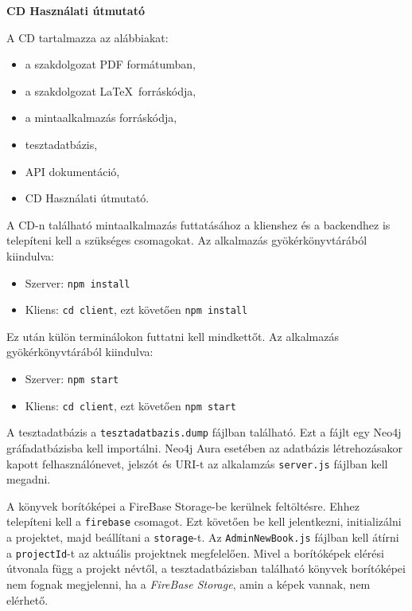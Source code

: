 \pagestyle{empty}

\noindent \textbf{\Large CD Használati útmutató}

\vskip 1cm

\noindent A CD tartalmazza az alábbiakat:
\begin{itemize}
    \item a szakdolgozat PDF formátumban,
    \item a szakdolgozat \LaTeX\ forráskódja,
    \item a mintaalkalmazás forráskódja,
    \item tesztadatbázis,
    \item API dokumentáció,
    \item CD Használati útmutató.
\end{itemize}

\bigskip

A CD-n található mintaalkalmazás futtatásához a klienshez és a backendhez is telepíteni kell a szükséges csomagokat. Az alkalmazás gyökérkönyvtárából kiindulva:
\begin{itemize}
    \item Szerver: \texttt{npm install}
    \item Kliens: \texttt{cd client}, ezt követően \texttt{npm install}
\end{itemize}

Ez után külön terminálokon futtatni kell mindkettőt. Az alkalmazás gyökérkönyvtárából kiindulva:
\begin{itemize}
    \item Szerver: \texttt{npm start}
    \item Kliens: \texttt{cd client}, ezt követően \texttt{npm start}
\end{itemize}

A tesztadatbázis a \texttt{tesztadatbazis.dump} fájlban található. Ezt a fájlt egy Neo4j gráfadatbázisba kell importálni. Neo4j Aura esetében az adatbázis létrehozásakor kapott felhasználónevet, jelszót és URI-t az alkalamzás \texttt{server.js} fájlban kell megadni.

\bigskip

A könyvek borítóképei a FireBase Storage-be kerülnek feltöltésre. Ehhez telepíteni kell a \texttt{firebase} csomagot. Ezt követően be kell jelentkezni, initializálni a projektet, majd beállítani a \texttt{storage}-t. Az \texttt{AdminNewBook.js} fájlban kell átírni a \texttt{projectId}-t az aktuális projektnek megfelelően. Mivel a borítóképek elérési útvonala függ a projekt névtől, a tesztadatbázisban található könyvek borítóképei nem fognak megjelenni, ha a \textit{FireBase Storage}, amin a képek vannak, nem elérhető.
